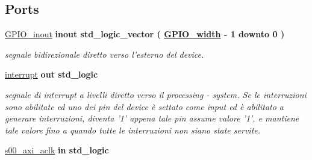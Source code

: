 \subsection*{Ports}
 \begin{DoxyCompactItemize}
\item 
\hypertarget{group___a_x_i-device_ga8829699d739ef35a4c5da396ffd38387}{\hyperlink{group___a_x_i-device_ga8829699d739ef35a4c5da396ffd38387}{G\+P\+I\+O\+\_\+inout}  {\bfseries {\bfseries \textcolor{vhdlchar}{inout}\textcolor{vhdlchar}{ }}} {\bfseries \textcolor{vhdlchar}{std\+\_\+logic\+\_\+vector}\textcolor{vhdlchar}{ }\textcolor{vhdlchar}{(}\textcolor{vhdlchar}{ }\textcolor{vhdlchar}{ }\textcolor{vhdlchar}{ }\textcolor{vhdlchar}{ }{\bfseries \hyperlink{group___a_x_i-device_ga0b52ca75e9a6093b2b60d5e851803069}{G\+P\+I\+O\+\_\+width}} \textcolor{vhdlchar}{-\/}\textcolor{vhdlchar}{ } \textcolor{vhdldigit}{1} \textcolor{vhdlchar}{ }\textcolor{vhdlchar}{downto}\textcolor{vhdlchar}{ }\textcolor{vhdlchar}{ } \textcolor{vhdldigit}{0} \textcolor{vhdlchar}{ }\textcolor{vhdlchar}{)}\textcolor{vhdlchar}{ }} }\label{group___a_x_i-device_ga8829699d739ef35a4c5da396ffd38387}

\begin{DoxyCompactList}\small\item\em segnale bidirezionale diretto verso l'esterno del device. \end{DoxyCompactList}\item 
\hypertarget{group___a_x_i-device_ga5b78f3e3edfaf6e8ec79031b9e631e9d}{\hyperlink{group___a_x_i-device_ga5b78f3e3edfaf6e8ec79031b9e631e9d}{interrupt}  {\bfseries {\bfseries \textcolor{vhdlchar}{out}\textcolor{vhdlchar}{ }}} {\bfseries \textcolor{vhdlchar}{std\+\_\+logic}\textcolor{vhdlchar}{ }} }\label{group___a_x_i-device_ga5b78f3e3edfaf6e8ec79031b9e631e9d}

\begin{DoxyCompactList}\small\item\em segnale di interrupt a livelli diretto verso il processing -\/ system. Se le interruzioni sono abilitate ed uno dei pin del device è settato come input ed è abilitato a generare interruzioni, diventa '1' appena tale pin assume valore '1', e mantiene tale valore fino a quando tutte le interruzioni non siano state servite. \end{DoxyCompactList}\item 
\hypertarget{group___a_x_i-device_ga037f9e3df8559bfd59db37bcba9cb7a8}{\hyperlink{group___a_x_i-device_ga037f9e3df8559bfd59db37bcba9cb7a8}{s00\+\_\+axi\+\_\+aclk}  {\bfseries {\bfseries \textcolor{vhdlchar}{in}\textcolor{vhdlchar}{ }}} {\bfseries \textcolor{vhdlchar}{std\+\_\+logic}\textcolor{vhdlchar}{ }} }\label{group___a_x_i-device_ga037f9e3df8559bfd59db37bcba9cb7a8}


\end{DoxyCompactItemize}

